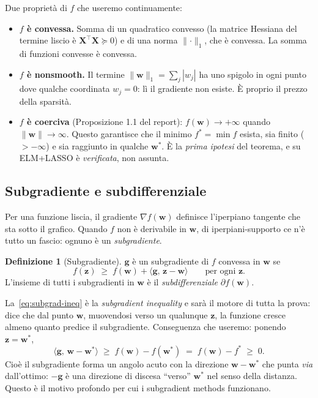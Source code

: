 \documentclass[11pt,a4paper]{article}
\theoremstyle{definition}
\newtheorem{definition}{Definizione}
\newcommand{\w}{\bm{w}}
\newcommand{\X}{\bm{X}}
\newcommand{\g}{\bm{g}}
\newcommand{\wstar}{\w^{*}}
\newcommand{\fstar}{f^{*}}
\newcommand{\inner}[2]{\langle #1,\, #2\rangle}
\newcommand{\norm}[1]{\lVert #1\rVert}
\begin{document}
Due proprietà di $f$ che useremo continuamente:
\begin{itemize}[leftmargin=1.4em]
\item \textbf{$f$ è convessa.} Somma di un quadratico convesso (la matrice Hessiana del
termine liscio è $\X^\top\X\succeq 0$) e di una norma $\norm{\cdot}_1$, che è convessa. La
somma di funzioni convesse è convessa.
\item \textbf{$f$ è nonsmooth.} Il termine $\norm{\w}_1=\sum_j|w_j|$ ha uno spigolo in ogni
punto dove qualche coordinata $w_j=0$: lì il gradiente non esiste. È proprio il prezzo della
sparsità.
\item \textbf{$f$ è coerciva} (Proposizione 1.1 del report): $f(\w)\to+\infty$ quando
$\norm{\w}\to\infty$. Questo garantisce che il minimo $\fstar=\min f$ esista, sia finito
($>-\infty$) e sia raggiunto in qualche $\wstar$. È la \emph{prima ipotesi} del teorema, e su
ELM+LASSO è \emph{verificata}, non assunta.
\end{itemize}

\subsection{Subgradiente e subdifferenziale}
\label{sub:subgrad}

Per una funzione liscia, il gradiente $\nabla f(\w)$ definisce l'iperpiano tangente che sta
sotto il grafico. Quando $f$ non è derivabile in $\w$, di iperpiani-supporto ce n'è tutto un
fascio: ognuno è un \emph{subgradiente}.

\begin{definition}[Subgradiente]
$\g$ è un subgradiente di $f$ convessa in $\w$ se
\begin{equation}\label{eq:subgrad-ineq}
f(\bm{z}) \;\ge\; f(\w) + \inner{\g}{\bm{z}-\w}\qquad\text{per ogni }\bm{z}.
\end{equation}
L'insieme di tutti i subgradienti in $\w$ è il \emph{subdifferenziale} $\partial f(\w)$.
\end{definition}

La~\eqref{eq:subgrad-ineq} è la \emph{subgradient inequality} e sarà il motore di tutta la
prova: dice che dal punto $\w$, muovendosi verso un qualunque $\bm{z}$, la funzione cresce
almeno quanto predice il subgradiente. Conseguenza che useremo: ponendo $\bm{z}=\wstar$,
\begin{equation}\label{eq:subgrad-verso-ottimo}
\inner{\g}{\w-\wstar} \;\ge\; f(\w)-f(\wstar) \;=\; f(\w)-\fstar \;\ge\;0 .
\end{equation}
Cioè il subgradiente forma un angolo acuto con la direzione $\w-\wstar$ che punta
\emph{via} dall'ottimo: $-\g$ è una direzione di discesa ``verso'' $\wstar$ nel senso della
distanza. Questo è il motivo profondo per cui i subgradient methods funzionano.
\end{document}
